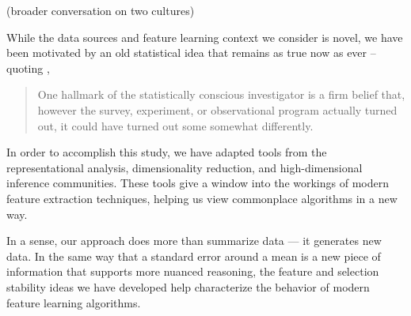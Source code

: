 (broader conversation on two cultures)

While the data sources and feature learning context we consider is novel, we
have been motivated by an old statistical idea that remains as true now as ever
-- quoting \citep{mosteller1977data},

\begin{quote}
One hallmark of the statistically conscious investigator is a firm belief that,
however the survey, experiment, or observational program actually turned out, it
could have turned out some somewhat differently.
\end{quote}

In order to accomplish this study, we have adapted tools from the
representational analysis, dimensionality reduction, and high-dimensional
inference communities. These tools give a window into the workings of modern
feature extraction techniques, helping us view commonplace algorithms in a new
way.

In a sense, our approach does more than summarize data — it generates new data.
In the same way that a standard error around a mean is a new piece of
information that supports more nuanced reasoning, the feature and selection
stability ideas we have developed help characterize the behavior of modern
feature learning algorithms.
